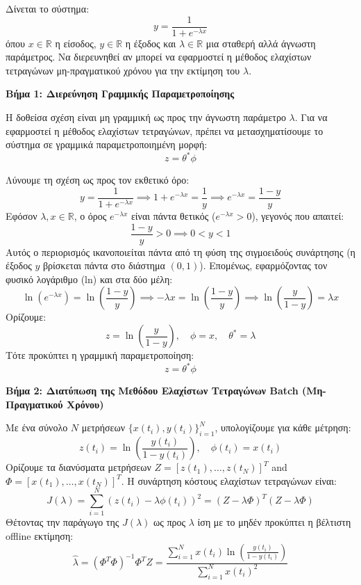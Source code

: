 \documentclass[a4paper,11pt]{article}
\begin{document}
\begin{question}
Δίνεται το σύστημα:
\begin{equation}
    y = \frac{1}{1 + e^{-\lambda x}}
\end{equation}
όπου $x \in \mathbb{R}$ η είσοδος, $y \in \mathbb{R}$ η έξοδος και $\lambda \in \mathbb{R}$ μια σταθερή αλλά άγνωστη παράμετρος. Να διερευνηθεί αν μπορεί να εφαρμοστεί η μέθοδος ελαχίστων τετραγώνων μη-πραγματικού χρόνου για την εκτίμηση του $\lambda$.
\end{question}

\begin{answer}
\textbf{Βήμα 1: Διερεύνηση Γραμμικής Παραμετροποίησης}

Η δοθείσα σχέση είναι μη γραμμική ως προς την άγνωστη παράμετρο $\lambda$. Για να εφαρμοστεί η μέθοδος ελαχίστων τετραγώνων, πρέπει να μετασχηματίσουμε το σύστημα σε γραμμικά παραμετροποιημένη μορφή:
\[ z = \theta^* \phi \]

Λύνουμε τη σχέση ως προς τον εκθετικό όρο:
\[ y = \frac{1}{1 + e^{-\lambda x}} \implies 1 + e^{-\lambda x} = \frac{1}{y} \implies e^{-\lambda x} = \frac{1-y}{y} \]
Εφόσον $\lambda, x \in \mathbb{R}$, ο όρος $e^{-\lambda x}$ είναι πάντα θετικός ($e^{-\lambda x} > 0$), γεγονός που απαιτεί:
\[ \frac{1-y}{y} > 0 \implies 0 < y < 1 \]
Αυτός ο περιορισμός ικανοποιείται πάντα από τη φύση της σιγμοειδούς συνάρτησης (η έξοδος $y$ βρίσκεται πάντα στο διάστημα $(0,1)$). Επομένως, εφαρμόζοντας τον φυσικό λογάριθμο (ln) και στα δύο μέλη:
\[ \ln\left(e^{-\lambda x}\right) = \ln\left(\frac{1-y}{y}\right) \implies -\lambda x = \ln\left(\frac{1-y}{y}\right) \implies \ln\left(\frac{y}{1-y}\right) = \lambda x \]
Ορίζουμε:
\[ z = \ln\left(\frac{y}{1-y}\right), \quad \phi = x, \quad \theta^* = \lambda \]
Τότε προκύπτει η γραμμική παραμετροποίηση:
\[ z = \theta^* \phi \]

\textbf{Βήμα 2: Διατύπωση της Μεθόδου Ελαχίστων Τετραγώνων Batch (Μη-Πραγματικού Χρόνου)}

Με ένα σύνολο $N$ μετρήσεων $\{x(t_i), y(t_i)\}_{i=1}^N$, υπολογίζουμε για κάθε μέτρηση:
\[ z(t_i) = \ln\left(\frac{y(t_i)}{1 - y(t_i)}\right), \quad \phi(t_i) = x(t_i) \]
Ορίζουμε τα διανύσματα μετρήσεων $Z = [z(t_1), \dots, z(t_N)]^T$ and $\Phi = [x(t_1), \dots, x(t_N)]^T$.
Η συνάρτηση κόστους ελαχίστων τετραγώνων είναι:
\[ J(\lambda) = \sum_{i=1}^N \left( z(t_i) - \lambda \phi(t_i) \right)^2 = (Z - \lambda \Phi)^T (Z - \lambda \Phi) \]
Θέτοντας την παράγωγο της $J(\lambda)$ ως προς $\lambda$ ίση με το μηδέν προκύπτει η βέλτιστη offline εκτίμηση:
\[ \hat{\lambda} = (\Phi^T \Phi)^{-1} \Phi^T Z = \frac{\sum_{i=1}^N x(t_i) \ln\left(\frac{y(t_i)}{1 - y(t_i)}\right)}{\sum_{i=1}^N x(t_i)^2} \]


\end{answer}
\end{document}
